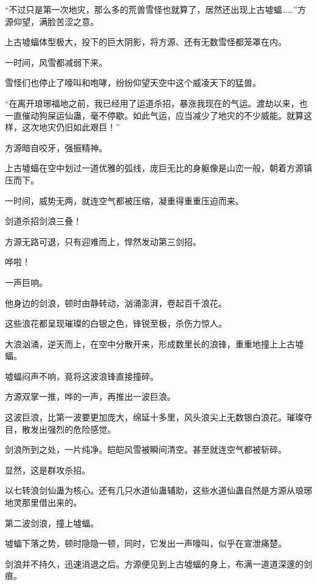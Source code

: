
\begin{this_body}



“不过只是第一次地灾，那么多的荒兽雪怪也就算了，居然还出现上古墟蝠……”方源仰望，满脸苦涩之意。

上古墟蝠体型极大，投下的巨大阴影，将方源、还有无数雪怪都笼罩在内。

一时间，风雪都减弱下来。

雪怪们也停止了嚎叫和咆哮，纷纷仰望天空中这个威凌天下的猛兽。

“在离开琅琊福地之前，我已经用了运道杀招，暴涨我现在的气运。渡劫以来，也一直催动狗屎运仙蛊，毫不停歇。如此气运，应当减少了地灾的不少威能。就算这样，这次地灾仍旧如此艰巨！”

方源暗自咬牙，强振精神。

上古墟蝠在空中划过一道优雅的弧线，庞巨无比的身躯像是山峦一般，朝着方源镇压而下。

一时间，威势无两，就连空气都被压缩，凝重得重重压迫而来。

剑道杀招剑浪三叠！

方源无路可退，只有迎难而上，悍然发动第三剑招。

哗啦！

一声巨响。

他身边的剑浪，顿时由静转动，汹涌澎湃，卷起百千浪花。

这些浪花都呈现璀璨的白银之色，锋锐至极，杀伤力惊人。

大浪汹涌，逆天而上，在空中分散开来，形成数里长的浪锋，重重地撞上上古墟蝠。

墟蝠闷声不响，竟将这波浪锋直接撞碎。

方源双掌一推，哗的一声，再推出一波巨浪。

这波巨浪，比第一波要更加庞大，绵延十多里，风头浪尖上无数银白浪花。璀璨夺目，散发出强烈的危险感觉。

剑浪所到之处，一片纯净。皑皑风雪被瞬间清空。甚至就连空气都被斩碎。

显然，这是群攻杀招。

以七转浪剑仙蛊为核心。还有几只水道仙蛊辅助，这些水道仙蛊自然是方源从琅琊地灵那里借出来的。

第二波剑浪，撞上墟蝠。

墟蝠下落之势，顿时隐隐一顿，同时，它发出一声嚎叫，似乎在宣泄痛楚。

剑浪并不持久，迅速消退之后。方源便见到上古墟蝠的身上，布满一道道深邃的剑痕。


\end{this_body}
